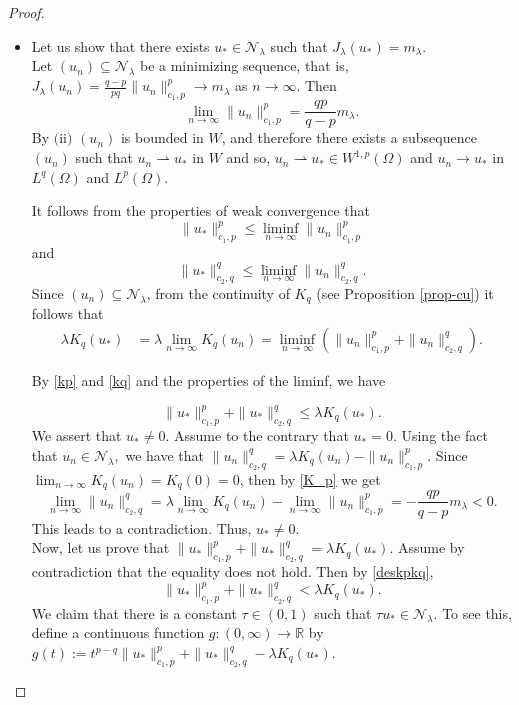 \documentclass[10pt,a4paper]{amsart}
\begin{document}
\begin{proof}
\begin{itemize}
\item[(iv)] Let us show that there exists $u_{*} \in \mathcal{N}_{\lambda}$ such that $J_{\lambda}\left(u_{*}\right)=m_{\lambda}$.\\
Let $\left(u_{n}\right) \subseteq \mathcal{N}_{\lambda}$ be a minimizing sequence, that is, $J_{\lambda}\left(u_{n}\right)=\frac{q-p}{pq}\|u_n \|_{c_1,p}^p \rightarrow m_{\lambda}$ as $n\to \infty$. Then \begin{equation}\label{K_p}
    \lim_{n\to\infty}\|u_n \|_{c_1,p}^p=\frac{qp}{q-p}m_{\lambda}.
\end{equation}
By $\mbox{(ii)}$ $\left(u_{n}\right)$ is bounded in $W$,  and therefore there exists a subsequence $\left(u_{n}\right)$ such that $u_{n} \rightharpoonup u_{*} \mbox{ in } W$ and so, $u_{n} \rightharpoonup u_{*} \in W^{1,p}(\Omega)$ and $u_{n} \to u_{*}$ in $L^{q}(\Omega)$ and $L^{p}( \Omega)$.

It follows from the properties of weak convergence  that
\begin{equation}\label{kp}
    \|u_* \|_{c_1,p}^p \leqslant \liminf_{n\to \infty} \|u_n \|_{c_1,p}^p
\end{equation}
and 
\begin{equation}\label{kq}
    \|u_*\|_{c_2,q}^q\leqslant \liminf_{n\to \infty} \|u_n \|_{c_2,q}^q.
\end{equation}
Since $(u_n)\subseteq \mathcal{N}_{\lambda}$, from the continuity of $K_q$ (see Proposition \ref{prop-cu}) it follows that 
\begin{align*}
    \lambda K_q(u_{*})&= \lambda \lim_{n\to\infty} K_q(u_n)=  \liminf_{n\to \infty}( \|u_n \|_{c_1,p}^p+\|u_n \|_{c_2,q}^q).
    \end{align*}

By \eqref{kp} and \eqref{kq} and the properties of the liminf, we have 

\begin{equation}\label{deskpkq}
    \|u_*\|_{c_1,p}^p+\|u_* \|_{c_2,q}^q\leqslant  \lambda K_q(u_{*}) .
\end{equation}
We assert that $u_{*}\neq 0.$ Assume to the contrary that $u_{*}= 0.$
Using the fact that $u_n\in \mathcal{N}_{\lambda},$ we have that $\|u_n \|_{c_2,q}^q=\lambda K_q(u_n)-\|u_n \|_{c_1,p}^p.$ Since $\lim_{n\to\infty}K_q(u_n)=K_q(0)=0$, then by  \eqref{K_p} we get \[\lim_{n\to\infty} \|u_n \|_{c_2,q}^q=\lambda\lim_{n\to\infty} K_q(u_n)-\lim_{n\to\infty} \|u_n \|_{c_1,p}^p=-\frac{qp}{q-p}m_{\lambda}<0.\]
This leads to a contradiction. Thus, $u_{*}\neq 0.$\\
Now, let us prove that  $\|u_*\|_{c_1,p}^p+\|u_* \|_{c_2,q}^q=\lambda K_q(u_{*})$. Assume by contradiction that the equality does not hold. Then by \eqref{deskpkq}, 
\begin{equation}\label{hpc}
\|u_*\|_{c_1,p}^p+\|u_* \|_{c_2,q}^q<\lambda K_q(u_{*}).
\end{equation}
We claim that there is a constant $\tau \in(0,1)$ such that $\tau u_{*} \in \mathcal{N}_{\lambda}$. To see this,  define a continuous function $g:(0, \infty) \rightarrow \mathbb{R}$ by
$
 g(t):=t^{p-q}\|u_*\|_{c_1,p}^p+\|u_* \|_{c_2,q}^q-\lambda K_q(u_{*}).
$


\end{itemize}
\end{proof}
\end{document}
